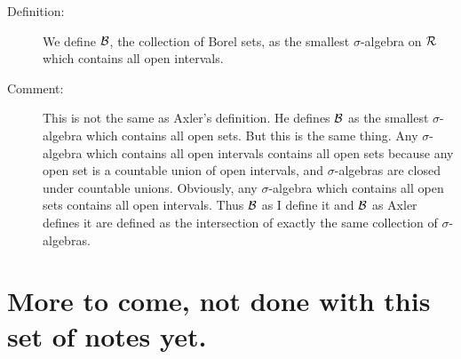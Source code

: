 \documentclass[12pt]{article}
\begin{document}
\begin{description}

\item[Definition:]  We define $\cal B$, the collection of Borel sets, as the smallest $\sigma$-algebra on $\cal R$ which contains all open intervals.

\item[Comment:]  This is not the same as Axler's definition.  He defines $\cal B$ as the smallest $\sigma$-algebra which contains all open sets.  But this is the same thing.
Any $\sigma$-algebra which contains all open intervals contains all open sets because any open set is a countable union of open intervals, and $\sigma$-algebras are closed under countable unions.  Obviously, any $\sigma$-algebra which contains all open sets contains all open intervals.  Thus $\cal B$ as I define it and $\cal B$ as Axler defines it are defined as the intersection of exactly the same collection of $\sigma$-algebras.

\end{description}

\section{More to come, not done with this set of notes yet.}
\end{document}
